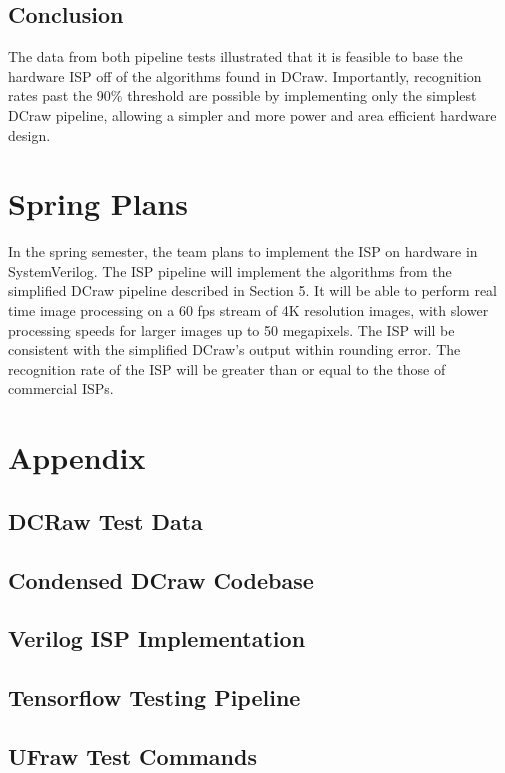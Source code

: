 \documentclass{report}
\begin{document}
	\section{Conclusion}
	The data from both pipeline tests illustrated that it is feasible to base the hardware ISP off of the algorithms found in DCraw. Importantly, recognition rates past the 90\% threshold are possible by implementing only the simplest DCraw pipeline, allowing a simpler and more power and area efficient hardware design.

\chapter{Spring Plans}
	In the spring semester, the team plans to implement the ISP on hardware in SystemVerilog. The ISP pipeline will implement the algorithms from the simplified DCraw pipeline described in Section 5. It will be able to perform real time image processing on a 60 fps stream of 4K resolution images, with slower processing speeds for larger images up to 50 megapixels. The ISP will be consistent with the simplified DCraw's output within rounding error. The recognition rate of the ISP will be greater than or equal to the those of commercial ISPs.  
	
\chapter{Appendix}

\section{DCRaw Test Data} \label{dcrawdata}

\section{Condensed DCraw Codebase}

\section{Verilog ISP Implementation}

\section{Tensorflow Testing Pipeline} \label{pipelinecode}

\section{UFraw Test Commands} \label{ufrawcommands}
\end{document}
